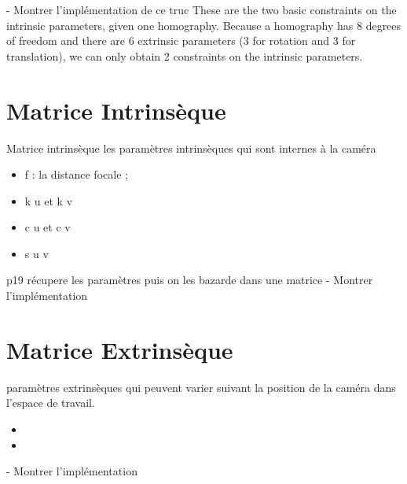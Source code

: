 \documentclass{article}
\begin{document}
- Montrer l'implémentation de ce truc
These are the two basic constraints on the intrinsic parameters, given one homography.  Because a
homography has 8 degrees of freedom and there are 6 extrinsic parameters (3 for rotation and 3 for
translation), we can only obtain 2 constraints on the intrinsic parameters.




\section{Matrice Intrinsèque}

Matrice intrinsèque
les paramètres intrinsèques qui sont internes à la caméra
\begin{itemize}
\item f : la distance focale ;
\item k u  et  k v %
\item c u  et  c v %
\item s u v %
\end{itemize}

p19 récupere les paramètres puis on les bazarde dans une matrice
- Montrer l'implémentation



\section{Matrice Extrinsèque}
paramètres extrinsèques qui peuvent varier suivant la position de la caméra dans l'espace de travail.
\begin{itemize}
\item %
\item %
\end{itemize}
- Montrer l'implémentation
\end{document}
